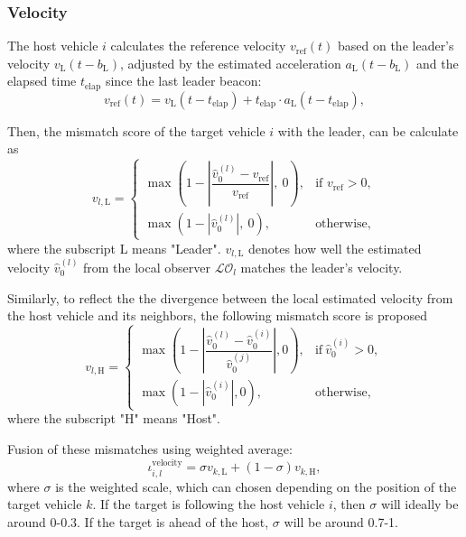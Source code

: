 \documentclass[letterpaper, 10pt, conference]{ieeeconf}  %
\def\N{\mathcal{N}} %
\def\LO{\mathcal{LO}} %
\begin{document}
\subsubsection{Velocity}
The host vehicle $i$ calculates the reference velocity $v_{\text{ref}}(t)$ based on the leader's velocity $v_{\text{L}}(t-b_{\text{L}})$, adjusted by the estimated acceleration $a_{\text{L}}(t-b_{\text{L}})$ and the elapsed time $t_{\text{elap}}$ since the last leader beacon:
\begin{equation}
    v_{\text{ref}}(t) = {v}_{\text{L}}(t-t_{\text{elap}}) + t_{\text{elap}} \cdot {a}_{\text{L}}(t-t_{\text{elap}}), 
\end{equation}

Then, the mismatch score of the target vehicle $i$ with the leader, can be calculate as
\begin{equation}
    v_{l,\text{L}} = 
        \begin{cases} 
            \max\left(1 - \left|\dfrac{\hat{v}_{0}^{(l)} - v_{\text{ref}}}{v_{\text{ref}}}\right|,\  0\right), & \text{if } v_\text{ref} > 0, \\
            \max\left(1 - | \hat{v}_{0}^{(l)}|,\  0\right), & \text{otherwise},
        \end{cases}
\end{equation}
where the subscript L means "Leader". 
$v_{l,\text{L}}$ denotes how well the estimated velocity $\hat{v}_{0}^{(l)}$ from the local observer $\LO_{l}$ matches the leader's velocity. 

Similarly, to reflect the the divergence between the local estimated velocity from the host vehicle and its neighbors, the following mismatch score is proposed
\begin{equation}
    v_{l,\text{H}} = 
        \begin{cases} 
            \max\left(1 - \left|\dfrac{\hat{v}_{0}^{(l)} - \hat{v}_{0}^{(i)}}{\hat{v}_{0}^{(j)}}\right|,  0\right), & \text{if} \  \hat{v}_{0}^{(i)} > 0, \\
            \max\left(1 - |\hat{v}_{0}^{(i)}|,  0\right), & \text{otherwise},
        \end{cases}
\end{equation}
where the subscript "H" means "Host". 



Fusion of these mismatches using weighted average:
\begin{equation}
    \iota_{i,l}^\text{velocity} = \sigma v_{k,\text{L}} + (1-\sigma) v_{k,\text{H}},    
\end{equation}
where $\sigma$ is the weighted scale, which can chosen depending on the position of the target vehicle $k$. If the target is following the host vehicle $i$, then $\sigma$ will ideally be around 0-0.3. If the target is ahead of the host, $\sigma$ will be around 0.7-1.
\end{document}
